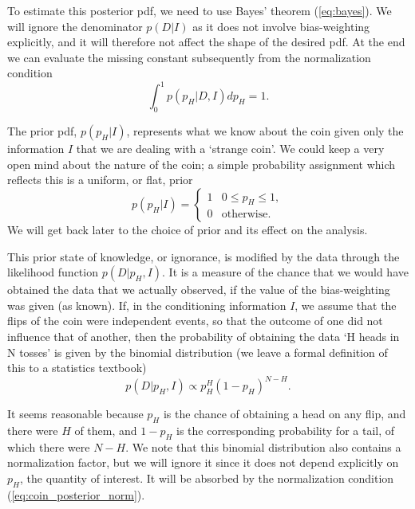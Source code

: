 \documentclass[%
oneside,                 %
final,                   %
10pt]{article}
\begin{document}
To estimate this posterior pdf, we need to use Bayes’ theorem (\ref{eq:bayes}). We will ignore the denominator $p(D|I)$ as it does not involve bias-weighting explicitly, and it will therefore not affect the shape of the desired pdf. At the end we can evaluate the missing constant subsequently from the normalization condition 
\begin{equation}
\int_0^1 p(p_H|D,I) dp_H = 1.
\label{eq:coin_posterior_norm}
\end{equation}

The prior pdf, $p(p_H|I)$, represents what we know about the coin given only the information $I$ that we are dealing with a ‘strange coin’. We could keep a very open mind about the nature of the coin; a simple probability assignment which reflects this is a uniform, or flat, prior
\begin{equation}
p(p_H|I) = \left\{ \begin{array}{ll}
1 & 0 \le p_H \le 1, \\
0 & \mathrm{otherwise}.
\end{array} \right.
\label{eq:coin_prior_uniform}
\end{equation}
We will get back later to the choice of prior and its effect on the analysis.

This prior state of knowledge, or ignorance, is modified by the data through the likelihood function $p(D|p_H,I)$. It is a measure of the chance that we would have obtained the data that we actually observed, if the value of the bias-weighting was given (as known). If, in the conditioning information $I$, we assume that the flips of the coin were independent events, so that the outcome of one did not influence that of another, then the probability of obtaining the data `H heads in N tosses' is given by the binomial distribution (we leave a formal definition of this to a statistics textbook)
\begin{equation}
p(D|p_H,I) \propto p_H^H (1-p_H)^{N-H}.
\end{equation}

It seems reasonable because $p_H$ is the chance of obtaining a head on any flip, and there were $H$ of them, and $1-p_H$ is the corresponding probability for a tail, of which there were $N-H$. We note that this binomial distribution also contains a normalization factor, but we will ignore it since it does not depend explicitly on $p_H$, the quantity of interest. It will be absorbed by the normalization condition (\ref{eq:coin_posterior_norm}).
\end{document}
